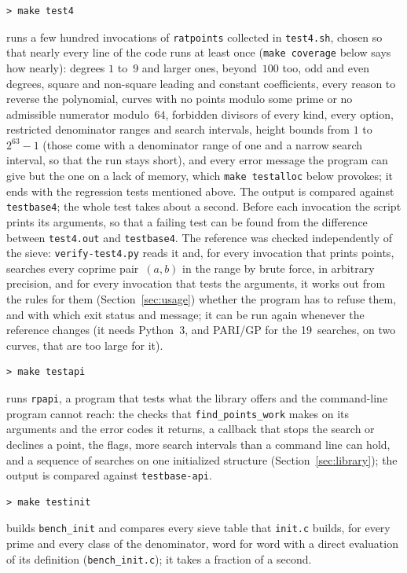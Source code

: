 \documentclass[12pt,a4paper,oneside]{amsart}
\begin{document}
\begin{verbatim}
> make test4
\end{verbatim}
runs a few hundred invocations of \texttt{ratpoints} collected in \texttt{test4.sh},
chosen so that nearly every line of the code runs at
least once (\texttt{make coverage} below says how nearly): degrees $1$ to~$9$ and larger ones, beyond~$100$ too,
odd and even degrees, square and non-square
leading and constant coefficients, every reason to reverse the polynomial,
curves with no points modulo some prime or no admissible numerator modulo~$64$,
forbidden divisors of every kind, every option, restricted denominator
ranges and search intervals, height bounds from $1$ to~$2^{63}-1$ (those come
with a denominator range of one and a narrow search interval, so that the
run stays short), and every error message the program can give but the one
on a lack of memory, which \texttt{make testalloc} below provokes; it ends
with the regression tests mentioned above.  The output is compared against
\texttt{testbase4}; the whole test takes about a second.  Before each invocation
the script prints its arguments, so that a failing test can be found from
the difference between \texttt{test4.out} and \texttt{testbase4}.  The
reference was checked independently of the sieve: \texttt{verify-test4.py}
reads it and, for every invocation that prints points, searches every
coprime pair~$(a, b)$ in the range by brute force, in arbitrary precision,
and for every invocation that tests the arguments, it works out from the
rules for them (Section~\ref{sec:usage}) whether the program has to refuse
them, and with which exit status and message;
it can be run again whenever the reference changes (it needs Python~3, and
PARI/GP for the 19~searches, on two curves, that are too large for it).

\begin{verbatim}
> make testapi
\end{verbatim}
runs \texttt{rpapi}, a program that tests what the library offers and the
command-line program cannot reach: the checks that
\texttt{find\_points\_work} makes on its arguments and the error codes it
returns, a callback that stops the search or declines a point, the flags,
more search intervals than a command line can hold, and a sequence of
searches on one initialized structure
(Section~\ref{sec:library}); the output is compared against
\texttt{testbase-api}.

\begin{verbatim}
> make testinit
\end{verbatim}
builds \texttt{bench\_init} and compares every sieve table that
\texttt{init.c} builds, for every prime and every class of the
denominator, word for word with a direct evaluation of its definition
(\texttt{bench\_init.c}); it takes a fraction of a second.
\end{document}
